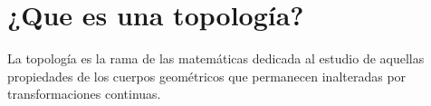 \documentclass{book}
\begin{document}
    \section{¿Que es una topología?}
    La topología es la rama de las matemáticas dedicada al estudio de aquellas propiedades de los cuerpos geométricos que permanecen inalteradas por transformaciones continuas.
    
\end{document}
